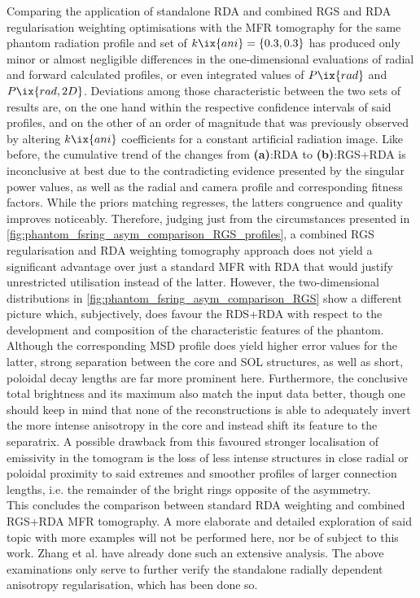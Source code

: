             Comparing the application of standalone RDA and combined RGS and RDA regularisation weighting optimisations with the MFR tomography for the same phantom radiation profile and set of $k\ix{ani}=\left\{0.3, 0.3\right\}$ has produced only minor or almost negligible differences in the one-dimensional evaluations of radial and forward calculated profiles, or even integrated values of $P\ix{rad}$ and $P\ix{rad,2D}$. Deviations among those characteristic between the two sets of results are, on the one hand within the respective confidence intervals of said profiles, and on the other of an order of magnitude that was previously observed by altering $k\ix{ani}$ coefficients for a constant artificial radiation image. Like before, the cumulative trend of the changes from \textbf{(a)}:RDA to \textbf{(b)}:RGS+RDA is inconclusive at best due to the contradicting evidence presented by the singular power values, as well as the radial and camera profile and corresponding fitness factors. While the priors matching regresses, the latters congruence and quality improves noticeably. Therefore, judging just from the circumstances presented in \cref{fig:phantom_fsring_asym_comparison_RGS_profiles}, a combined RGS regularisation and RDA weighting tomography approach does not yield a significant advantage over just a standard MFR with RDA that would justify unrestricted utilisation instead of the latter. However, the two-dimensional distributions in \cref{fig:phantom_fsring_asym_comparison_RGS} show a different picture which, subjectively, does favour the RDS+RDA with respect to the development and composition of the characteristic features of the phantom. Although the corresponding MSD profile does yield higher error values for the latter, strong separation between the core and SOL structures, as well as short, poloidal decay lengths are far more prominent here. Furthermore, the conclusive total brightness and its maximum also match the input data better, though one should keep in mind that none of the reconstructions is able to adequately invert the more intense anisotropy in the core and instead shift its feature to the separatrix. A possible drawback from this favoured stronger localisation of emissivity in the tomogram is the loss of less intense structures in close radial or poloidal proximity to said extremes and smoother profiles of larger connection lengths, i.e. the remainder of the bright rings opposite of the asymmetry.\\%
            This concludes the comparison between standard RDA weighting and combined RGS+RDA MFR tomography. A more elaborate and detailed exploration of said topic with more examples will not be performed here, nor be of subject to this work. Zhang et al.\cite{Zhang2013,Zhang2021_2} have already done such an extensive analysis. The above examinations only serve to further verify the standalone radially dependent anisotropy regularisation, which has been done so.\\%
%
